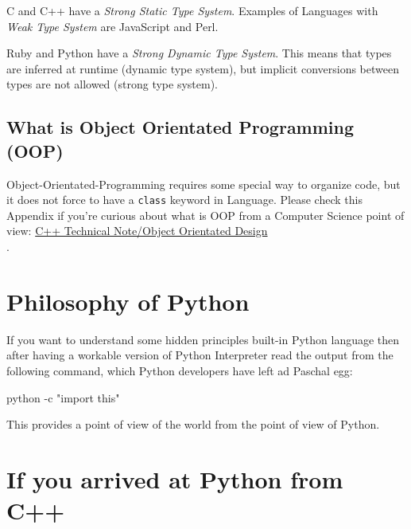 \documentclass[
]{article}
\newenvironment{Shaded}{}{}
\newcommand{\AttributeTok}[1]{\textcolor[rgb]{0.49,0.56,0.16}{#1}}
\newcommand{\ExtensionTok}[1]{#1}
\newcommand{\StringTok}[1]{\textcolor[rgb]{0.25,0.44,0.63}{#1}}
\begin{document}
C and C++ have a \emph{Strong Static Type System}. Examples of Languages
with \emph{Weak Type System} are JavaScript and Perl.

Ruby and Python have a \emph{Strong Dynamic Type System}. This means
that types are inferred at runtime (dynamic type system), but implicit
conversions between types are not allowed (strong type system).

\hypertarget{what-is-object-orientated-programming-oop}{%
\subsection{What is Object Orientated Programming
(OOP)}\label{what-is-object-orientated-programming-oop}}

Object-Orientated-Programming requires some special way to organize
code, but it does not force to have a \texttt{class} keyword in
Language. Please check this Appendix if you're curious about what is OOP
from a Computer Science point of view:
\href{https://github.com/burlachenkok/CPP_from_1998_to_2020/blob/main/Cpp-Technical-Note.md\#object-orientated-design}{C++
Technical Note/Object Orientated Design\\
}.

\hypertarget{philosophy-of-python}{%
\section{Philosophy of Python}\label{philosophy-of-python}}

If you want to understand some hidden principles built-in Python
language then after having a workable version of Python Interpreter read
the output from the following command, which Python developers have left
ad Paschal egg:

\begin{Shaded}
\begin{Highlighting}[]
\ExtensionTok{python} \AttributeTok{{-}c} \StringTok{"import this"}
\end{Highlighting}
\end{Shaded}

This provides a point of view of the world from the point of view of
Python.

\hypertarget{if-you-arrived-at-python-from-c}{%
\section{If you arrived at Python from
C++}\label{if-you-arrived-at-python-from-c}}
\end{document}
